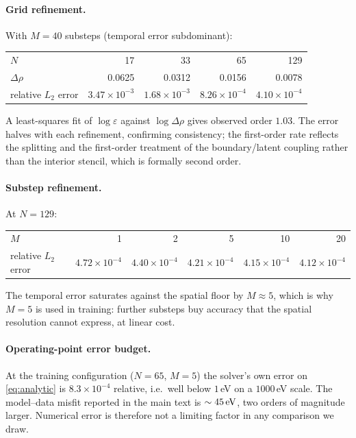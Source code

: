 \paragraph{Grid refinement.} With $M = 40$ substeps (temporal error
subdominant):
\begin{center}
\begin{tabular}{lrrrr}
\toprule
$N$ & 17 & 33 & 65 & 129 \\
$\Delta\rho$ & 0.0625 & 0.0312 & 0.0156 & 0.0078 \\
relative $L_2$ error & $3.47\times10^{-3}$ & $1.68\times10^{-3}$ & $8.26\times10^{-4}$ & $4.10\times10^{-4}$ \\
\bottomrule
\end{tabular}
\end{center}
A least-squares fit of $\log\varepsilon$ against $\log\Delta\rho$ gives
observed order $1.03$. The error halves with each refinement, confirming
consistency; the first-order rate reflects the splitting and the
first-order treatment of the boundary/latent coupling rather than the
interior stencil, which is formally second order.

\paragraph{Substep refinement.} At $N = 129$:
\begin{center}
\begin{tabular}{lrrrrr}
\toprule
$M$ & 1 & 2 & 5 & 10 & 20 \\
relative $L_2$ error & $4.72\times10^{-4}$ & $4.40\times10^{-4}$ & $4.21\times10^{-4}$ & $4.15\times10^{-4}$ & $4.12\times10^{-4}$ \\
\bottomrule
\end{tabular}
\end{center}
The temporal error saturates against the spatial floor by $M \approx 5$,
which is why $M = 5$ is used in training: further substeps buy accuracy
that the spatial resolution cannot express, at linear cost.

\paragraph{Operating-point error budget.} At the training configuration
($N = 65$, $M = 5$) the solver's own error on \eqref{eq:analytic} is
$8.3\times10^{-4}$ relative, i.e.\ well below $1\,$eV on a $1000\,$eV
scale. The model--data misfit reported in the main text is
$\sim\SI{45}{eV}$, two orders of magnitude larger. Numerical error is
therefore not a limiting factor in any comparison we draw.


